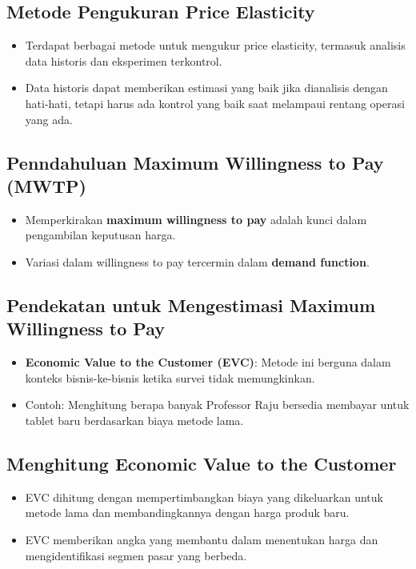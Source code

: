 \documentclass{article}
\begin{document}
\subsection{Metode Pengukuran Price Elasticity}
\begin{itemize}
    \item Terdapat berbagai metode untuk mengukur price elasticity, termasuk analisis data historis dan eksperimen terkontrol.
    \item Data historis dapat memberikan estimasi yang baik jika dianalisis dengan hati-hati, tetapi harus ada kontrol yang baik saat melampaui rentang operasi yang ada.
\end{itemize}

\subsection{Penndahuluan Maximum Willingness to Pay (MWTP)}
\begin{itemize}
    \item Memperkirakan \textbf{maximum willingness to pay} adalah kunci dalam pengambilan keputusan harga.
    \item Variasi dalam willingness to pay tercermin dalam \textbf{demand function}.
\end{itemize}

\subsection{Pendekatan untuk Mengestimasi Maximum Willingness to Pay}
\begin{itemize}
    \item \textbf{Economic Value to the Customer (EVC)}: Metode ini berguna dalam konteks bisnis-ke-bisnis ketika survei tidak memungkinkan.
    \item Contoh: Menghitung berapa banyak Professor Raju bersedia membayar untuk tablet baru berdasarkan biaya metode lama.
\end{itemize}

\subsection{Menghitung Economic Value to the Customer}
\begin{itemize}
    \item EVC dihitung dengan mempertimbangkan biaya yang dikeluarkan untuk metode lama dan membandingkannya dengan harga produk baru.
    \item EVC memberikan angka yang membantu dalam menentukan harga dan mengidentifikasi segmen pasar yang berbeda.
\end{itemize}
\end{document}
